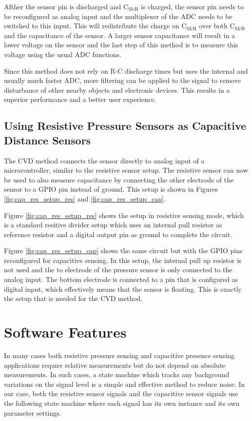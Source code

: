 \documentclass{sigchi-ext}
\begin{document}
Afther the sensor pin is discharged and $\textrm{C}_{\textrm{S\&H}}$ is
charged, the sensor pin needs to be reconfigured as analog input and the
multiplexer of the ADC needs to be switched to this input. This will
redistribute the charge on $\textrm{C}_{\textrm{S\&H}}$ over both
$\textrm{C}_{\textrm{S\&H}}$ and the capacitance of the sensor. A larger sensor
capacitance will result in a lower voltage on the sensor and the last step of
this method is to measure this voltage using the usual ADC functions.

Since this method does not rely on R-C discharge times but uses the internal and
usually much faster ADC, more filtering can be applied to the signal to remove
disturbance of other nearby objects and electronic devices. This results in a
superior performance and a better user experience.

\subsection{Using Resistive Pressure Sensors as Capacitive Distance Sensors}
The CVD method connects the sensor directly to analog input of a
microcontroller, similar to the resistive sensor setup. The resistive sensor can
now be used to also measure capacitance by connecting the other electrode of the
sensor to a GPIO pin instead of ground. This setup is shown in Figures
\ref{fig:cap_res_setup_res} and \ref{fig:cap_res_setup_cap}.

Figure \ref{fig:cap_res_setup_res} shows the setup in resistive sensing mode,
which is a standard resitive divider setup which uses an internal pull resistor
as reference resistor and a digital output pin as ground to complete the
circuit.

Figure \ref{fig:cap_res_setup_cap} shows the same circuit but with the GPIO pins
reconfigured for capacitive sensing. In this setup, the internal pull up
resistor is not used and the to electrode of the pressure sensor is only
connected to the analog input. The bottom electrode is connected to a pin that
is configured as digital input, which effectively means that the sensor is
floating. This is exactly the setup that is needed for the CVD method.

\section{Software Features}
In many cases both resistive pressure sensing and capacitive presence sensing
applications require relative measurements but do not depend on absolute
measurements. In such cases, a state machine which tracks any background
variations on the signal level is a simple and effective method to reduce noise.
In our case, both the resistive sensor signals and the capacitive sensor signals
use the following state machine where each signal has its own instance and
its own parameter settings.
\end{document}
